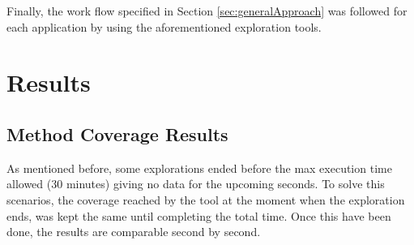 \begin{table}[t]
	\centering
	\caption{Applications used for the study}
	\label{tab:apps}
\end{table}

Finally, the work flow specified in Section \ref{sec:generalApproach} was followed for each application by using the aforementioned exploration tools. 

\section{Results}\label{sec:results}

\subsection{Method Coverage Results}\label{sec:coverageResults}

As mentioned before, some explorations ended before the max execution time allowed (30 minutes) giving no data for the upcoming seconds. To solve this scenarios, the coverage reached by the tool at the moment when the exploration ends, was kept the same until completing the total time. Once this have been done, the results are comparable second by second.


